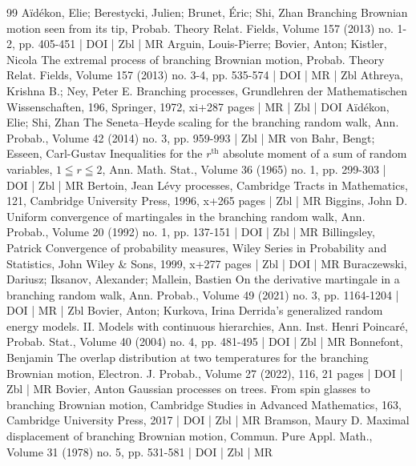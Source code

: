 \documentclass[10pt]{amsart}
\theoremstyle{definition}\newtheorem{defi}[theo]{Definition}\newtheorem{rema}[theo]{Remark}\newtheorem{exam}[theo]{Example}\newtheorem{exem}[theo]{Example}\newtheorem{nota}[theo]{Notation}
\newcommand\1{\mathds{1}}
\begin{document}
\begin{thebibliography}{99}
 Aïdékon, Elie; Berestycki, Julien; Brunet, Éric; Shi, Zhan Branching Brownian motion seen from its tip, Probab. Theory Relat. Fields, Volume 157 (2013) no. 1-2, pp. 405-451 | DOI | Zbl | MR
 Arguin, Louis-Pierre; Bovier, Anton; Kistler, Nicola The extremal process of branching Brownian motion, Probab. Theory Relat. Fields, Volume 157 (2013) no. 3-4, pp. 535-574 | DOI | MR | Zbl
 Athreya, Krishna B.; Ney, Peter E. Branching processes, Grundlehren der Mathematischen Wissenschaften, 196, Springer, 1972, xi+287 pages | MR | Zbl | DOI
 Aïdékon, Elie; Shi, Zhan The Seneta–Heyde scaling for the branching random walk, Ann. Probab., Volume 42 (2014) no. 3, pp. 959-993 | Zbl | MR
 von Bahr, Bengt; Esseen, Carl-Gustav Inequalities for the $r^{\text{th}}$ absolute moment of a sum of random variables, $1 \leqq r \leqq 2$, Ann. Math. Stat., Volume 36 (1965) no. 1, pp. 299-303 | DOI | Zbl | MR
 Bertoin, Jean Lévy processes, Cambridge Tracts in Mathematics, 121, Cambridge University Press, 1996, x+265 pages | Zbl | MR
 Biggins, John D. Uniform convergence of martingales in the branching random walk, Ann. Probab., Volume 20 (1992) no. 1, pp. 137-151 | DOI | Zbl | MR
 Billingsley, Patrick Convergence of probability measures, Wiley Series in Probability and Statistics, John Wiley \& Sons, 1999, x+277 pages | Zbl | DOI | MR
 Buraczewski, Dariusz; Iksanov, Alexander; Mallein, Bastien On the derivative martingale in a branching random walk, Ann. Probab., Volume 49 (2021) no. 3, pp. 1164-1204 | DOI | MR | Zbl
 Bovier, Anton; Kurkova, Irina Derrida’s generalized random energy models. II. Models with continuous hierarchies, Ann. Inst. Henri Poincaré, Probab. Stat., Volume 40 (2004) no. 4, pp. 481-495 | DOI | Zbl | MR
 Bonnefont, Benjamin The overlap distribution at two temperatures for the branching Brownian motion, Electron. J. Probab., Volume 27 (2022), 116, 21 pages | DOI | Zbl | MR
 Bovier, Anton Gaussian processes on trees. From spin glasses to branching Brownian motion, Cambridge Studies in Advanced Mathematics, 163, Cambridge University Press, 2017 | DOI | Zbl | MR
 Bramson, Maury D. Maximal displacement of branching Brownian motion, Commun. Pure Appl. Math., Volume 31 (1978) no. 5, pp. 531-581 | DOI | Zbl | MR

\end{thebibliography}
\end{document}
